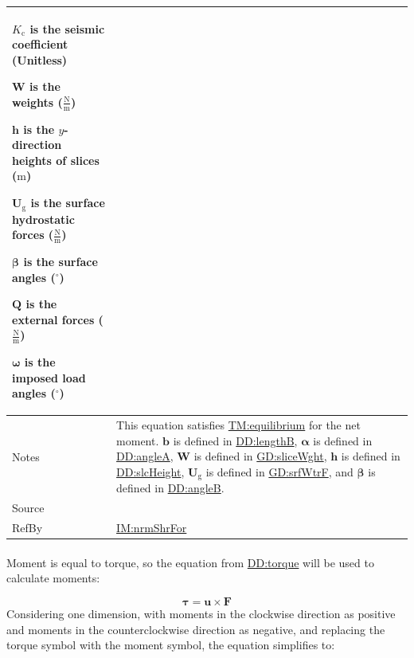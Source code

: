 \documentclass[12pt]{article}
\begin{document}
\begin{minipage}{\textwidth}
\begin{tabular}{>{\raggedright}p{}>{\raggedright\arraybackslash}p{}}
\begin{symbDescription}
              \item{${K_{\text{c}}}$ is the seismic coefficient (Unitless)}
              \item{$\symbf{W}$ is the weights ($\frac{\text{N}}{\text{m}}$)}
              \item{$\symbf{h}$ is the $y$-direction heights of slices (${\text{m}}$)}
              \item{${\symbf{U}_{\text{g}}}$ is the surface hydrostatic forces ($\frac{\text{N}}{\text{m}}$)}
              \item{$\symbf{β}$ is the surface angles (${{}^{\circ}}$)}
              \item{$\symbf{Q}$ is the external forces ($\frac{\text{N}}{\text{m}}$)}
              \item{$\symbf{ω}$ is the imposed load angles (${{}^{\circ}}$)}
              \end{symbDescription}
\\ \midrule
Notes & This equation satisfies \hyperref[TM:equilibrium]{TM:equilibrium} for the net moment. $\symbf{b}$ is defined in \hyperref[DD:lengthB]{DD:lengthB}, $\symbf{α}$ is defined in \hyperref[DD:angleA]{DD:angleA}, $\symbf{W}$ is defined in \hyperref[GD:sliceWght]{GD:sliceWght}, $\symbf{h}$ is defined in \hyperref[DD:slcHeight]{DD:slcHeight}, ${\symbf{U}_{\text{g}}}$ is defined in \hyperref[GD:srfWtrF]{GD:srfWtrF}, and $\symbf{β}$ is defined in \hyperref[DD:angleB]{DD:angleB}.
        
\\ \midrule
Source & \cite{chen2005}
         
\\ \midrule
RefBy & \hyperref[IM:nrmShrFor]{IM:nrmShrFor}
        
\\ \bottomrule
\end{tabular}
\end{minipage}

\paragraph{}
\label{GD:momentEqlDeriv}
Moment is equal to torque, so the equation from \hyperref[DD:torque]{DD:torque} will be used to calculate moments:

\begin{displaymath}
\symbf{τ}=\symbf{u}\times\symbf{F}
\end{displaymath}
Considering one dimension, with moments in the clockwise direction as positive and moments in the counterclockwise direction as negative, and replacing the torque symbol with the moment symbol, the equation simplifies to:
\end{document}
